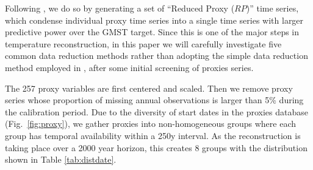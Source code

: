 \documentclass[12pt]{amsart}
\theoremstyle{plain}
\theoremstyle{definition}
\theoremstyle{remark}
\newcommand{\lb}[1]{\color{MidnightBlue}\textbf{[LB: #1]}\normalcolor}
\newcommand{\jeg}[1]{\color{ProcessBlue}\textbf{[JEG: #1]}\normalcolor}
\begin{document}
Following \cite{Barboza2014}, we do so by generating a set of ``Reduced Proxy ($RP$)'' time series, which condense individual proxy time series into a single time series with larger predictive power over the GMST target. Since this is one of the major steps in temperature reconstruction, in this paper we will carefully investigate five common data reduction methods rather than adopting the simple data reduction method employed in \cite{Barboza2014}, after some initial screening of proxies series.    

The 257 proxy variables are first centered and scaled. Then we remove
proxy series whose proportion of missing annual observations is larger than 5\%
during the calibration  period.  %
Due to the diversity of start dates in the proxies database (Fig.~\ref{fig:proxy}), we gather proxies into non-homogeneous groups where each group has temporal availability within a 250y interval. As the reconstruction is taking place over a 2000 year
horizon, this creates 8 groups with the distribution shown in Table \ref{tab:distdate}. 
\end{document}
